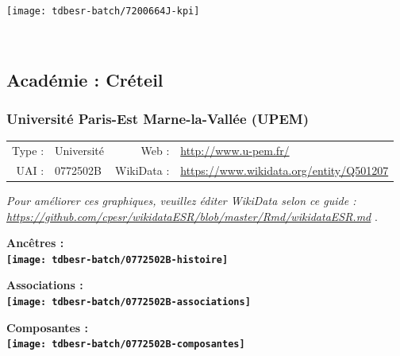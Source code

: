\documentclass[12pt,french,]{article}
\begin{document}
\begin{center}\texttt{[image: tdbesr-batch/7200664J-kpi]} \end{center}\checkoddpage

\ifoddpage \fi ~\newpage  

\hypertarget{acaduxe9mie-cruxe9teil}{%
\subsection{Académie : Créteil}\label{acaduxe9mie-cruxe9teil}}

\hypertarget{universituxe9-paris-est-marne-la-valluxe9e-upem}{%
\subsubsection{Université Paris-Est Marne-la-Vallée
(UPEM)}\label{universituxe9-paris-est-marne-la-valluxe9e-upem}}

\begin{tabular*}{\textwidth}{rp{5cm}rl}  
\hline  
Type : & Université & Web : &\href{http://www.u-pem.fr/}{http://www.u-pem.fr/} \\  
UAI : & 0772502B & WikiData : & \href{https://www.wikidata.org/entity/Q501207}{https://www.wikidata.org/entity/Q501207} \\  
\hline  
\end{tabular*}

\textit{\scriptsize Pour améliorer ces graphiques, veuillez éditer WikiData selon ce guide :  \href{https://github.com/cpesr/wikidataESR/blob/master/Rmd/wikidataESR.md}{https://github.com/cpesr/wikidataESR/blob/master/Rmd/wikidataESR.md}}
.

\vspace{1cm}  
\begin{minipage}[b]{0.50\textwidth}\begin{center} \bf Ancêtres : \\  
\texttt{[image: tdbesr-batch/0772502B-histoire]} \end{center}\end{minipage}\begin{minipage}[b]{0.50\textwidth}\begin{center} \bf Associations : \\  
\texttt{[image: tdbesr-batch/0772502B-associations]} \end{center}\end{minipage}

\hrulefill

\begin{center} \bf Composantes : \\  
\texttt{[image: tdbesr-batch/0772502B-composantes]} \end{center}
\end{document}
